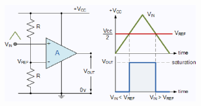 \begin{frame}
\begin{columns}
\begin{figure}
\end{figure}
\begin{figure}
	\centering
	\includegraphics[scale=0.22]{Images/App_fig3.eps}
\end{figure}
\end{columns}

\begin{scriptsize}
\cite{risi2014massive}
\end{scriptsize}
\end{frame}
